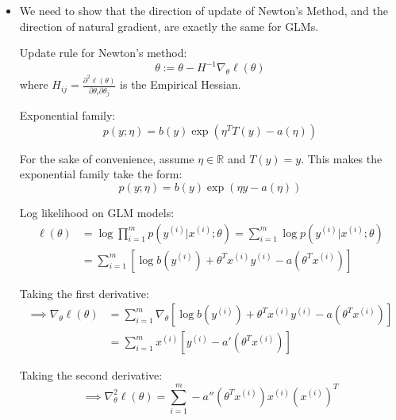 \begin{solution}
\begin{itemize}
              Finally, substitute $B$ back into the KL divergence equation:
              \[
                  D_{\text{KL}}(P_\theta || P_{\theta+d}) \approx A - \left( A - \frac{1}{2} d^T \mathcal{I}(\theta) d \right) = \frac{1}{2} d^T \mathcal{I}(\theta) d
              \]

        \item[(b)]
              We need to show that the direction of update of Newton's Method, and the direction of natural gradient, are exactly the same for GLMs.

              Update rule for Newton's method:
              \[
                  \theta := \theta - H^{-1} \nabla_\theta \ell(\theta)
              \]
              where $H_{ij} = \frac{\partial^2 \ell(\theta)}{\partial \theta_i \partial \theta_j}$ is the Empirical Hessian.

              Exponential family:
              \[
                  p(y; \eta) = b(y) \exp(\eta^T T(y) - a(\eta))
              \]

              For the sake of convenience, assume $\eta \in \mathbb{R}$ and $T(y) = y$. This makes the exponential family take the form:
              \[
                  p(y; \eta) = b(y) \exp(\eta y - a(\eta))
              \]

              Log likelihood on GLM models:
              \begin{align*}
                  \ell(\theta) & = \log \prod_{i=1}^m p(y^{(i)} | x^{(i)} ; \theta) = \sum_{i=1}^m \log p(y^{(i)} | x^{(i)} ; \theta) \\
                               & = \sum_{i=1}^m \left[ \log b(y^{(i)}) + \theta^T x^{(i)} y^{(i)} - a(\theta^T x^{(i)}) \right]
              \end{align*}

              Taking the first derivative:
              \begin{align*}
                  \implies \nabla_\theta \ell(\theta) & = \sum_{i=1}^m \nabla_\theta \left[ \log b(y^{(i)}) + \theta^T x^{(i)} y^{(i)} - a(\theta^T x^{(i)}) \right] \\
                                                      & = \sum_{i=1}^m x^{(i)} \left[ y^{(i)} - a'(\theta^T x^{(i)}) \right]
              \end{align*}

              Taking the second derivative:
              \[
                  \implies \nabla_\theta^2 \ell(\theta) = \sum_{i=1}^m -a''(\theta^T x^{(i)}) x^{(i)} (x^{(i)})^T
              \]


\end{itemize}
\end{solution}
